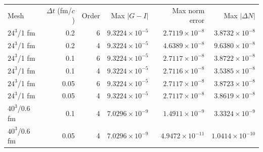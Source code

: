 \begin{tabular}{lrrrrr}
\toprule
Mesh & $\Delta t$ (fm/$c$) & Order & Max $|G-I|$ & Max norm error & Max $|\Delta N|$ \\
$24^3$/1 fm & 0.2 & 6 & $9.3224\times10^{-5}$ & $2.7119\times10^{-8}$ & $3.8732\times10^{-8}$ \\
$24^3$/1 fm & 0.2 & 4 & $9.3224\times10^{-5}$ & $4.6389\times10^{-8}$ & $9.6380\times10^{-8}$ \\
$24^3$/1 fm & 0.1 & 6 & $9.3224\times10^{-5}$ & $2.7117\times10^{-8}$ & $3.8722\times10^{-8}$ \\
$24^3$/1 fm & 0.1 & 4 & $9.3224\times10^{-5}$ & $2.7116\times10^{-8}$ & $3.5385\times10^{-8}$ \\
$24^3$/1 fm & 0.05 & 6 & $9.3224\times10^{-5}$ & $2.7117\times10^{-8}$ & $3.8723\times10^{-8}$ \\
$24^3$/1 fm & 0.05 & 4 & $9.3224\times10^{-5}$ & $2.7117\times10^{-8}$ & $3.8619\times10^{-8}$ \\
$40^3$/0.6 fm & 0.1 & 4 & $7.0296\times10^{-9}$ & $1.4911\times10^{-9}$ & $3.3324\times10^{-9}$ \\
$40^3$/0.6 fm & 0.05 & 4 & $7.0296\times10^{-9}$ & $4.9472\times10^{-11}$ & $1.0414\times10^{-10}$ \\
\bottomrule
\end{tabular}
